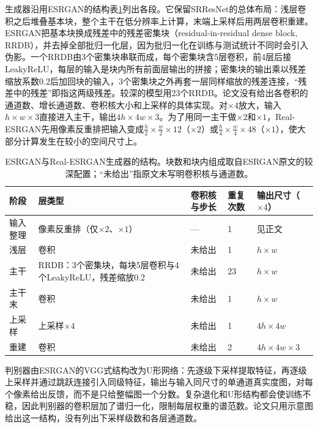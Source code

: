 生成器沿用ESRGAN的结构表\ref{tab:vision-esrgan-generator}列出各段。它保留SRResNet的总体布局：浅层卷积之后堆叠基本块，整个主干在低分辨率上计算，末端上采样后用两层卷积重建。ESRGAN把基本块换成残差中的残差密集块（residual-in-residual dense block, RRDB），并去掉全部批归一化层，因为批归一化在训练与测试统计不同时会引入伪影。一个RRDB由3个密集块串联而成，每个密集块含5层卷积，前4层后接LeakyReLU，每层的输入是块内所有前面层输出的拼接；密集块的输出乘以残差缩放系数0.2后加回块的输入，3个密集块之外再套一层同样缩放的残差连接，“残差中的残差”即指这两级残差。较深的模型用23个RRDB。论文没有给出各卷积的通道数、增长通道数、卷积核大小和上采样的具体实现。对$\times4$放大，输入$h\times w\times3$直接进入主干，输出$4h\times4w\times3$。为了用同一主干做$\times2$和$\times1$，Real-ESRGAN先用像素反重排把输入变成$\frac{h}{2}\times\frac{w}{2}\times12$（$\times2$）或$\frac{h}{4}\times\frac{w}{4}\times48$（$\times1$），使大部分计算发生在较小的空间尺寸上。

\begin{table}[htbp]
 \centering
 \small
 \begin{tabularx}{\linewidth}{@{}p{14mm}Xp{12mm}p{10mm}p{18mm}@{}}
  \toprule
  阶段 & 层类型 & 卷积核与步长 & 重复次数 & 输出尺寸（$\times4$）\\
  \midrule
  输入整理 & 像素反重排（仅$\times2$、$\times1$） & — & 1 & 见正文\\
  浅层 & 卷积 & 未给出 & 1 & $h\times w$\\
  主干 & RRDB：3个密集块，每块5层卷积与4个LeakyReLU，残差缩放0.2 & 未给出 & 23 & $h\times w$\\
  主干末 & 卷积 & 未给出 & 1 & $h\times w$\\
  上采样 & 上采样$\times4$ & 未给出 & 1 & $4h\times4w$\\
  重建 & 卷积 & 未给出 & 2 & $4h\times4w\times3$\\
  \bottomrule
 \end{tabularx}
 \caption{ESRGAN与Real-ESRGAN生成器的结构。块数和块内组成取自ESRGAN原文的较深配置；“未给出”指原文未写明卷积核与通道数。}
 \label{tab:vision-esrgan-generator}
\end{table}

判别器由ESRGAN的VGG式结构改为U形网络：先逐级下采样提取特征，再逐级上采样并通过跳跃连接引入同级特征，输出与输入同尺寸的单通道真实度图，对每个像素给出反馈，而不是只给整幅图一个分数。复杂退化和U形结构都会使训练不稳，因此判别器的卷积层加了谱归一化，限制每层权重的谱范数。论文只用示意图给出这一结构，没有列出下采样级数和各层通道数。

